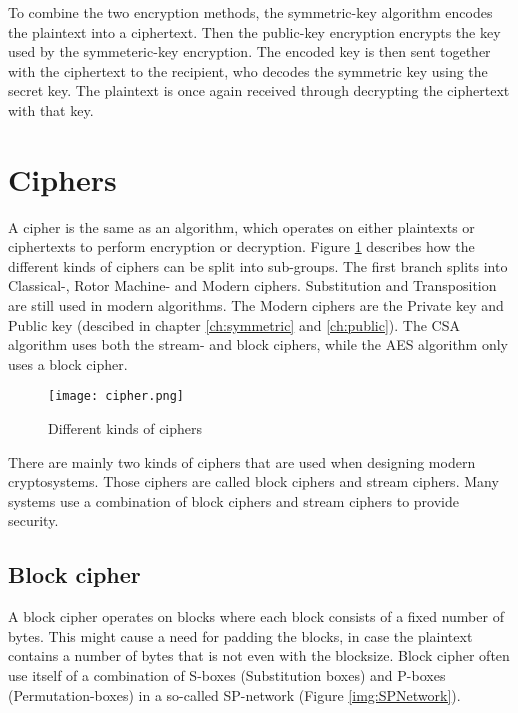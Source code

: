 To combine the two encryption methods, the symmetric-key algorithm 
encodes the plaintext into a ciphertext. Then the public-key encryption 
encrypts the key used by the symmeteric-key encryption. 
The encoded key is then sent together with the ciphertext to the 
recipient, who decodes the symmetric key using the secret key. The 
plaintext is once again received through decrypting the ciphertext 
with that key.

\section{Ciphers}
A cipher is the same as an algorithm, which operates on either 
plaintexts or ciphertexts to perform encryption or decryption. Figure 
\ref{img:ciphers} describes how the different kinds of ciphers can be 
split into sub-groups. The first branch splits into Classical-, 
Rotor Machine- and Modern ciphers. Substitution and Transposition are 
still used in modern algorithms. The Modern ciphers are the Private 
key and Public key (descibed in chapter \ref{ch:symmetric} and 
\ref{ch:public}). The CSA algorithm uses both the stream- and block ciphers, while the AES algorithm only uses a block cipher.

\begin{figure}
  \texttt{[image: cipher.png]}
  \caption{Different kinds of ciphers \citep{CipherTax:2013}}
  \label{img:ciphers}
\end{figure}

There are mainly two kinds of ciphers that are used when designing 
modern cryptosystems. Those ciphers are called block ciphers and 
stream ciphers. Many systems use a combination of block ciphers and 
stream ciphers to provide security. 


\subsection{Block cipher}\label{sec:BlockCipher}
A block cipher operates on blocks where each block consists of a fixed 
number of bytes. This might cause a need for padding the blocks, in 
case the plaintext contains a number of bytes that is not even with the 
blocksize. Block cipher often use itself of a combination of S-boxes 
(Substitution boxes) and P-boxes (Permutation-boxes) in a so-called 
SP-network (Figure \ref{img:SPNetwork}).

